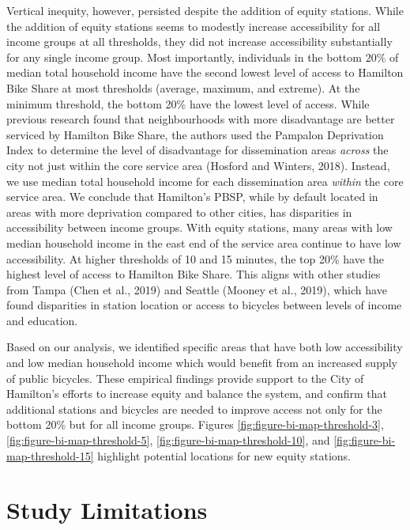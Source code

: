 \documentclass[]{elsarticle} %
\begin{document}
Vertical inequity, however, persisted despite the addition of equity
stations. While the addition of equity stations seems to modestly
increase accessibility for all income groups at all thresholds, they did
not increase accessibility substantially for any single income group.
Most importantly, individuals in the bottom 20\% of median total
household income have the second lowest level of access to Hamilton Bike
Share at most thresholds (average, maximum, and extreme). At the minimum
threshold, the bottom 20\% have the lowest level of access. While
previous research found that neighbourhoods with more disadvantage are
better serviced by Hamilton Bike Share, the authors used the Pampalon
Deprivation Index to determine the level of disadvantage for
dissemination areas \emph{across} the city not just within the core
service area (Hosford and Winters, 2018). Instead, we use median total
household income for each dissemination area \emph{within} the core
service area. We conclude that Hamilton's PBSP, while by default located
in areas with more deprivation compared to other cities, has disparities
in accessibility between income groups. With equity stations, many areas
with low median household income in the east end of the service area
continue to have low accessibility. At higher thresholds of 10 and 15
minutes, the top 20\% have the highest level of access to Hamilton Bike
Share. This aligns with other studies from Tampa (Chen et al., 2019) and
Seattle (Mooney et al., 2019), which have found disparities in station
location or access to bicycles between levels of income and education.

Based on our analysis, we identified specific areas that have both low
accessibility and low median household income which would benefit from
an increased supply of public bicycles. These empirical findings provide
support to the City of Hamilton's efforts to increase equity and balance
the system, and confirm that additional stations and bicycles are needed
to improve access not only for the bottom 20\% but for all income
groups. Figures \ref{fig:figure-bi-map-threshold-3},
\ref{fig:figure-bi-map-threshold-5},
\ref{fig:figure-bi-map-threshold-10}, and
\ref{fig:figure-bi-map-threshold-15} highlight potential locations for
new equity stations.

\hypertarget{study-limitations}{%
\section{Study Limitations}\label{study-limitations}}
\end{document}
